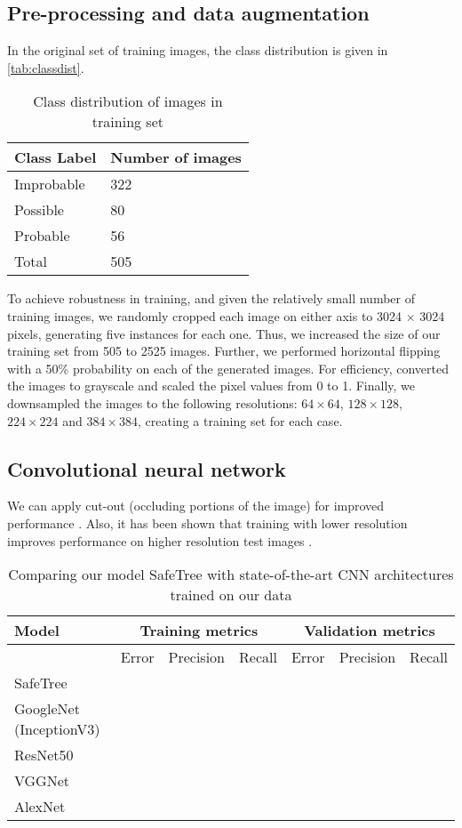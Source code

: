 \documentclass[11pt,twoside]{article}
\numberwithin{equation}{section}
\newcommand{\?}{\stackrel{?}{=}}
\begin{document}
\subsection{Pre-processing and data augmentation}
In the original set of training images, the class distribution is given in \autoref{tab:classdist}.

\begin{table}[h!]\small
    \centering
    \begin{tabular}{l l}\toprule
    \bf Class Label     & \bf Number of images  \\ \midrule
    Improbable & 322\\
    Possible & 80 \\
    Probable & 56 \\\midrule
    Total & 505 \\\bottomrule
    \end{tabular}
    \caption{Class distribution of images in training set}
    \label{tab:classdist}
\end{table}

To achieve robustness in training, and given the relatively small number of training images, we randomly cropped each image on either axis to 3024 $\times$ 3024 pixels, generating five instances for each one. Thus, we increased the size of our training set from 505 to 2525 images. Further, we performed horizontal flipping with a 50\% probability on each of the generated images. For efficiency, converted the images to grayscale and scaled the pixel values from 0 to 1. Finally, we downsampled the images to the following resolutions: $64 \times 64$, $128 \times 128$, $224 \times 224$ and $384\times 384$, creating a training set for each case. 

\subsection{Convolutional neural network}

We can apply cut-out (occluding portions of the image) for improved performance \cite{devries2017improved}. Also, it has been shown that training with lower resolution improves performance on higher resolution test images \cite{touvronfixing}.

\begin{table}[h!]\small
  \centering
  \begin{tabular}{l l l l l l l }\toprule
    \bf Model & \multicolumn{3}{c}{\bf Training metrics} &\multicolumn{3}{c}{\bf Validation metrics}  \\\midrule
    & Error & Precision & Recall     & Error & Precision & Recall \\
    SafeTree & & & & & & \\
    GoogleNet (InceptionV3) & & & & & & \\
    ResNet50 & & & & & & \\
        VGGNet & & & & & & \\
    AlexNet & & & & & & \\\bottomrule
  \end{tabular}
  \caption{Comparing our model SafeTree with state-of-the-art CNN architectures trained on our data}
  \label{tab:comp}
\end{table}
\end{document}

